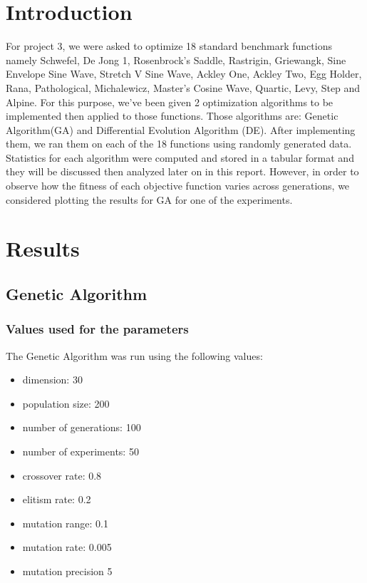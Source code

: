 \documentclass[12pt]{article}
\begin{document}
	\section{Introduction}
	For project 3, we were asked to optimize 18 standard benchmark functions namely Schwefel, De Jong 1, Rosenbrock's Saddle, Rastrigin, Griewangk, Sine Envelope Sine Wave, Stretch V Sine Wave, Ackley One, Ackley Two, Egg Holder, Rana, Pathological, Michalewicz, Master's Cosine Wave, Quartic, Levy, Step and Alpine. For this purpose, we've been given 2 optimization algorithms to be implemented then applied to those functions. Those algorithms are: Genetic Algorithm(GA) and Differential Evolution Algorithm (DE). After implementing them, we ran them on each of the 18 functions using randomly generated data. Statistics for each algorithm were computed and stored in a tabular format and they will be discussed then analyzed later on in this report. However, in order to observe how the fitness of each objective function varies across generations, we considered plotting the results for GA for one of the experiments.
	
		
	\section{Results}
	
		\subsection{Genetic Algorithm}
		
			\subsubsection{Values used for the parameters}
				The Genetic Algorithm was  run using  the following values:
				\begin{itemize}
					\item dimension: 30
					\item population size: 200
					\item number of generations: 100
					\item number of experiments: 50
					\item crossover rate: 0.8
					\item elitism rate: 0.2
					\item mutation range: 0.1
					\item mutation rate: 0.005
					\item mutation precision 5
				\end{itemize}
		
\end{document}
